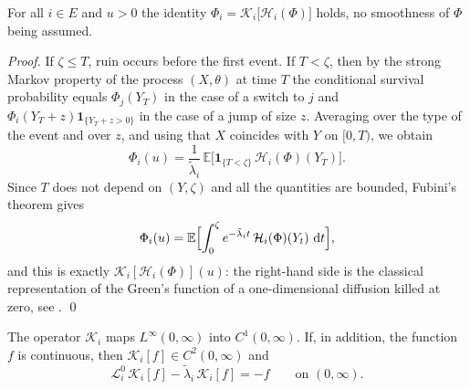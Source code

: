 \documentclass[smallextended]{svjour3}
\newcommand{\bbe}{\mathbb{E}}
\newcommand{\Ind}{\mathbf{1}}
\newcommand{\diff}{\mathop{}\!\mathrm{d}}
\begin{document}
\begin{lemma}
\label{lem:repr}
For all $i\in E$ and $u>0$ the identity
$\Phi_i=\mathcal K_i\bigl[\mathcal H_i(\Phi)\bigr]$ holds, no smoothness of
$\Phi$ being assumed.
\end{lemma}

\begin{proof}
If $\zeta\le T$, ruin occurs before the first event. If $T<\zeta$, then by the
strong Markov property of the process $(X,\theta)$ at time $T$ the conditional
survival probability equals $\Phi_j(Y_T)$ in the case of a switch to $j$ and
$\Phi_i(Y_T+z)\Ind_{\{Y_T+z>0\}}$ in the case of a jump of size $z$. Averaging
over the type of the event and over $z$, and using that $X$ coincides with $Y$
on $[0,T)$, we obtain
$$
\Phi_i(u)=\frac{1}{\tilde\lambda_i}\,
\bbe\bigl[\Ind_{\{T<\zeta\}}\,\mathcal H_i(\Phi)(Y_T)\bigr] .
$$
Since $T$ does not depend on $(Y,\zeta)$ and all the quantities are bounded,
Fubini's theorem gives
$$
\Phi_i(u)=\bbe\Bigl[\int_0^{\zeta}e^{-\tilde\lambda_i t}\,
\mathcal H_i(\Phi)(Y_t)\,\diff t\Bigr],
$$
and this is exactly $\mathcal K_i[\mathcal H_i(\Phi)](u)$: the right-hand side
is the classical representation of the Green's function of a one-dimensional
diffusion killed at zero, see \cite[Part~I, Ch.~II, \S\S\,1, 4]{Borodin}.
\qed
\end{proof}

\begin{lemma}
\label{lem:LtoC}
The operator $\mathcal K_i$ maps $L^\infty(0,\infty)$ into $C^1(0,\infty)$. If,
in addition, the function $f$ is continuous, then
$\mathcal K_i[f]\in C^2(0,\infty)$ and
\begin{equation}
    \label{eq:resolvent_ode}
    \mathcal L_i^0\,\mathcal K_i[f]-\tilde\lambda_i\,\mathcal K_i[f]=-f
    \qquad \text{on } (0,\infty).
\end{equation}
\end{lemma}
\end{document}
